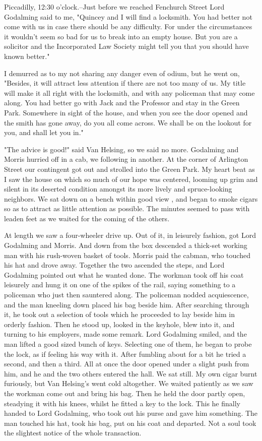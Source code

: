 Piccadilly, 12:30 o'clock.--Just before we reached Fenchurch Street Lord Godalming said to me, "Quincey and I will find a locksmith. You had better not come with us in case there should be any difficulty. For under the circumstances it wouldn't seem so bad for us to break into an empty house. But you are a solicitor and the Incorporated Law Society might tell you that you should have known better." 

I demurred as to my not sharing any danger even of odium, but he went on, "Besides, it will attract less attention if there are not too many of us. My title will make it all right with the locksmith, and with any policeman that may come along. You had better go with Jack and the Professor and stay in the Green Park. Somewhere in sight of the house, and when you see the door opened and the smith has gone away, do you all come across. We shall be on the lookout for you, and shall let you in." 

"The advice is good!" said Van Helsing, so we said no more. Godalming and Morris hurried off in a cab, we following in another. At the corner of Arlington Street our contingent got out and strolled into the Green Park. My heart beat as I saw the house on which so much of our hope was centered, looming up grim and silent in its deserted condition amongst its more lively and spruce-looking neighbors. We sat down on a bench within good view , and began to smoke cigars so as to attract as little attention as possible. The minutes seemed to pass with leaden feet as we waited for the coming of the others. 

At length we saw a four-wheeler drive up. Out of it, in leisurely fashion, got Lord Godalming and Morris. And down from the box descended a thick-set working man with his rush-woven basket of tools. Morris paid the cabman, who touched his hat and drove away. Together the two ascended the steps, and Lord Godalming pointed out what he wanted done. The workman took off his coat leisurely and hung it on one of the spikes of the rail, saying something to a policeman who just then sauntered along. The policeman nodded acquiescence, and the man kneeling down placed his bag beside him. After searching through it, he took out a selection of tools which he proceeded to lay beside him in orderly fashion. Then he stood up, looked in the keyhole, blew into it, and turning to his employers, made some remark. Lord Godalming smiled, and the man lifted a good sized bunch of keys. Selecting one of them, he began to probe the lock, as if feeling his way with it. After fumbling about for a bit he tried a second, and then a third. All at once the door opened under a slight push from him, and he and the two others entered the hall. We sat still. My own cigar burnt furiously, but Van Helsing's went cold altogether. We waited patiently as we saw the workman come out and bring his bag. Then he held the door partly open, steadying it with his knees, whilst he fitted a key to the lock. This he finally handed to Lord Godalming, who took out his purse and gave him something. The man touched his hat, took his bag, put on his coat and departed. Not a soul took the slightest notice of the whole transaction. 

